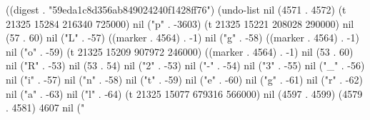 
((digest . "59eda1c8d356ab849024240f1428ff76") (undo-list nil (4571 . 4572) (t 21325 15284 216340 725000) nil ("p" . -3603) (t 21325 15221 208028 290000) nil (57 . 60) nil ("L" . -57) ((marker . 4564) . -1) nil ("g" . -58) ((marker . 4564) . -1) nil ("o" . -59) (t 21325 15209 907972 246000) ((marker . 4564) . -1) nil (53 . 60) nil ("R" . -53) nil (53 . 54) nil ("2" . -53) nil ("-" . -54) nil ("3" . -55) nil ("_" . -56) nil ("i" . -57) nil ("n" . -58) nil ("t" . -59) nil ("e" . -60) nil ("g" . -61) nil ("r" . -62) nil ("a" . -63) nil ("l" . -64) (t 21325 15077 679316 566000) nil (4597 . 4599) (4579 . 4581) 4607 nil ("%

